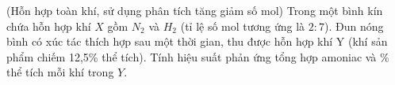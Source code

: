 \begin{vd}
	(Hỗn hợp toàn khí, sử dụng phân tích tăng giảm số mol)
	Trong một bình kín chứa hỗn hợp khí $X$ gồm $N_2$ và $H_2$ (tỉ lệ số mol tương ứng là $2: 7$). Đun nóng bình có xúc tác thích hợp sau một thời gian, thu được hỗn hợp khí Y (khí sản phẩm chiếm 12,5\% thể tích). Tính hiệu suất phản ứng tổng hợp amoniac và $\%$ thể tích mỗi khí trong $Y$.
	\loigiai{
	}
\end{vd}

